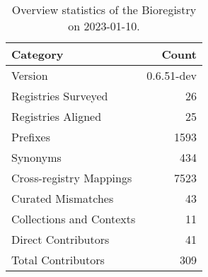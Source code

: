 \begin{table}
\centering
\caption{Overview statistics of the Bioregistry on 2023-01-10.}
\label{tab:bioregistry-summary}
\begin{tabular}{lr}
\toprule
                Category &      Count \\
\midrule
                 Version & 0.6.51-dev \\
     Registries Surveyed &         26 \\
      Registries Aligned &         25 \\
                Prefixes &       1593 \\
                Synonyms &        434 \\
 Cross-registry Mappings &       7523 \\
      Curated Mismatches &         43 \\
Collections and Contexts &         11 \\
     Direct Contributors &         41 \\
      Total Contributors &        309 \\
\bottomrule
\end{tabular}
\end{table}
